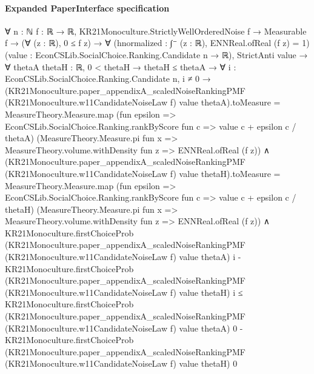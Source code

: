 \documentclass[10pt]{article}
\begin{document}
\paragraph{Expanded PaperInterface specification}
\begin{ReviewVerbatim}
∀ {n : ℕ} {f : ℝ → ℝ},
  KR21Monoculture.StrictlyWellOrderedNoise f →
    Measurable f →
      (∀ (z : ℝ), 0 ≤ f z) →
        ∀ (hnormalized : ∫⁻ (z : ℝ), ENNReal.ofReal (f z) = 1) (value : EconCSLib.SocialChoice.Ranking.Candidate n → ℝ),
          StrictAnti value →
            ∀ {thetaA thetaH : ℝ},
              0 < thetaH →
                thetaH ≤ thetaA →
                  ∀ {i : EconCSLib.SocialChoice.Ranking.Candidate n},
                    i ≠ 0 →
                      (KR21Monoculture.paper_appendixA_scaledNoiseRankingPMF (KR21Monoculture.w11CandidateNoiseLaw f)
                              value thetaA).toMeasure =
                          MeasureTheory.Measure.map
                            (fun epsilon =>
                              EconCSLib.SocialChoice.Ranking.rankByScore fun c => value c + epsilon c / thetaA)
                            (MeasureTheory.Measure.pi fun x =>
                              MeasureTheory.volume.withDensity fun z => ENNReal.ofReal (f z)) ∧
                        (KR21Monoculture.paper_appendixA_scaledNoiseRankingPMF (KR21Monoculture.w11CandidateNoiseLaw f)
                                value thetaH).toMeasure =
                            MeasureTheory.Measure.map
                              (fun epsilon =>
                                EconCSLib.SocialChoice.Ranking.rankByScore fun c => value c + epsilon c / thetaH)
                              (MeasureTheory.Measure.pi fun x =>
                                MeasureTheory.volume.withDensity fun z => ENNReal.ofReal (f z)) ∧
                          KR21Monoculture.firstChoiceProb
                                (KR21Monoculture.paper_appendixA_scaledNoiseRankingPMF
                                  (KR21Monoculture.w11CandidateNoiseLaw f) value thetaA)
                                i -
                              KR21Monoculture.firstChoiceProb
                                (KR21Monoculture.paper_appendixA_scaledNoiseRankingPMF
                                  (KR21Monoculture.w11CandidateNoiseLaw f) value thetaH)
                                i ≤
                            KR21Monoculture.firstChoiceProb
                                (KR21Monoculture.paper_appendixA_scaledNoiseRankingPMF
                                  (KR21Monoculture.w11CandidateNoiseLaw f) value thetaA)
                                0 -
                              KR21Monoculture.firstChoiceProb
                                (KR21Monoculture.paper_appendixA_scaledNoiseRankingPMF
                                  (KR21Monoculture.w11CandidateNoiseLaw f) value thetaH)
                                0
\end{ReviewVerbatim}
\end{document}

